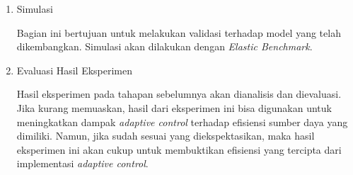 \begin{enumerate}
\begin{enumerate}
        \item Simulasi
        
        Bagian ini bertujuan untuk melakukan validasi terhadap model yang telah dikembangkan. Simulasi akan dilakukan dengan \textit{Elastic Benchmark}.
    
        \item Evaluasi Hasil Eksperimen
        
        Hasil eksperimen pada tahapan sebelumnya akan dianalisis dan dievaluasi. Jika kurang memuaskan, hasil dari eksperimen ini bisa digunakan untuk meningkatkan dampak \textit{adaptive control} terhadap efisiensi sumber daya yang dimiliki. Namun, jika sudah sesuai yang diekspektasikan, maka hasil eksperimen ini akan cukup untuk membuktikan efisiensi yang tercipta dari implementasi \textit{adaptive control}.
    \end{enumerate}
\end{enumerate}
